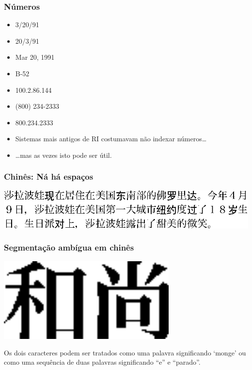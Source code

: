 \documentclass[compress]{beamer}
\begin{document}
\begin{frame}
\frametitle{Números}
\begin{itemize}[<+->]
\item 3/20/91
\item 20/3/91
\item Mar 20, 1991
\item B-52
\item 100.2.86.144
\item (800) 234-2333
\item 800.234.2333
\item Sistemas mais antigos de RI costumavam não indexar números\ldots
\item \ldots  mas as vezes isto pode ser útil.
\end{itemize}
\end{frame}



\begin{frame}
\frametitle{Chinês: Ná há espaços}

\includegraphics{Chinese-example.eps}

\end{frame}

\begin{frame}
\frametitle{Segmentação ambígua em chinês}

\includegraphics[width=9cm]{ChineseAmbiguous.eps}

Os dois caracteres podem ser tratados como uma palavra significando `monge' 
ou como uma sequência de duas palavras significando ``e'' e ``parado''.


\end{frame}
\end{document}
